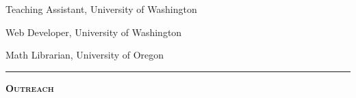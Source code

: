 \documentclass[12pt]{article}
\newcommand{\sectionheading}[1]
{
\bigskip %
\noindent
\hspace{-6.5mm}\textcolor{Gray}{\rule[.75mm]{21.5mm}{1mm}} %
\hspace{.2mm}	%
{\large{\textbf{\textsc{#1}}}} %
}
\newenvironment{date_section}
	{
	\vspace{-1ex}
	\leftmargini = 15ex
		\begin{itemize}[
			labelsep = *,
			labelwidth = 9ex,
			labelindent = 0ex,
			itemindent = !,
			font=\normalfont,
			align=parleft
		]{}
		\itemsep=-1.5mm
	}
	{\end{itemize}\vspace{-2ex}}
\newcommand{\yearmo}[2]{
	\item[
		{\makebox[1ex][r]{#1}}
		\hspace{1ex}
		{\makebox[1ex][l]{#2} }
		] }
\newcommand{\yearrange}[2]{
	\item[
		{\makebox[1ex][r]{#1}}
		--
		{\makebox[1ex][l]{#2} }
		] }
\begin{document}
	\begin{date_section}
		
		\yearrange{2013}{2018} Teaching Assistant,  University of Washington
		
		\yearrange{2015}{2017} Web Developer, University of Washington
		
		
		
		\yearrange{2012}{2013} Math Librarian, University of Oregon
		
		
		
		
		
		
	\end{date_section}

%
%
%
%

	\sectionheading{Outreach}%
\end{document}

